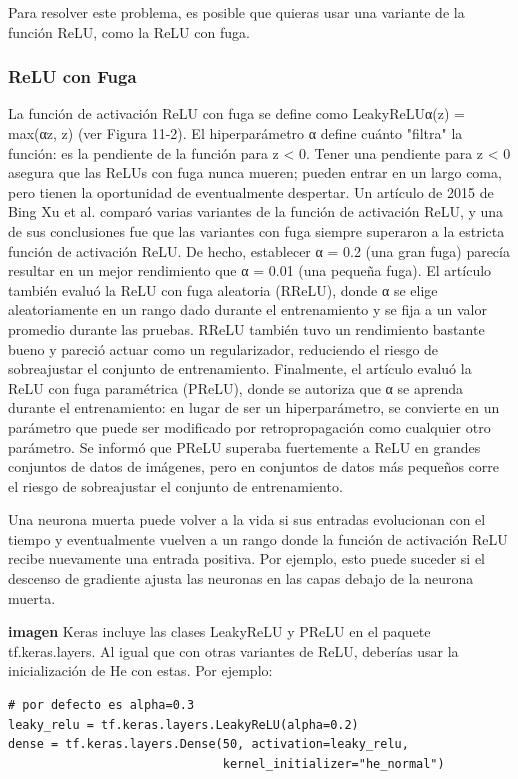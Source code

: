 \documentclass[11pt]{article}
\begin{document}
Para resolver este problema, es posible que quieras usar una variante
de la función ReLU, como la ReLU con fuga.

\subsubsection{ReLU con Fuga}
\label{sec:orgf55f9e6}
La función de activación ReLU con fuga se define como LeakyReLUα(z) =
max(αz, z) (ver Figura 11-2). El hiperparámetro α define cuánto
"filtra" la función: es la pendiente de la función para z < 0. Tener
una pendiente para z < 0 asegura que las ReLUs con fuga nunca mueren;
pueden entrar en un largo coma, pero tienen la oportunidad de
eventualmente despertar. Un artículo de 2015 de Bing Xu et al. comparó
varias variantes de la función de activación ReLU, y una de sus
conclusiones fue que las variantes con fuga siempre superaron a la
estricta función de activación ReLU. De hecho, establecer α = 0.2 (una
gran fuga) parecía resultar en un mejor rendimiento que α = 0.01 (una
pequeña fuga). El artículo también evaluó la ReLU con fuga aleatoria
(RReLU), donde α se elige aleatoriamente en un rango dado durante el
entrenamiento y se fija a un valor promedio durante las pruebas. RReLU
también tuvo un rendimiento bastante bueno y pareció actuar como un
regularizador, reduciendo el riesgo de sobreajustar el conjunto de
entrenamiento. Finalmente, el artículo evaluó la ReLU con fuga
paramétrica (PReLU), donde se autoriza que α se aprenda durante el
entrenamiento: en lugar de ser un hiperparámetro, se convierte en un
parámetro que puede ser modificado por retropropagación como cualquier
otro parámetro. Se informó que PReLU superaba fuertemente a ReLU en
grandes conjuntos de datos de imágenes, pero en conjuntos de datos más
pequeños corre el riesgo de sobreajustar el conjunto de entrenamiento.

Una neurona muerta puede volver a la vida si sus entradas evolucionan
con el tiempo y eventualmente vuelven a un rango donde la función de
activación ReLU recibe nuevamente una entrada positiva. Por ejemplo,
esto puede suceder si el descenso de gradiente ajusta las neuronas en
las capas debajo de la neurona muerta.

\textbf{imagen} Keras incluye las clases LeakyReLU y PReLU en el paquete
tf.keras.layers. Al igual que con otras variantes de ReLU, deberías
usar la inicialización de He con estas. Por ejemplo:

\begin{verbatim}
# por defecto es alpha=0.3
leaky_relu = tf.keras.layers.LeakyReLU(alpha=0.2)
dense = tf.keras.layers.Dense(50, activation=leaky_relu,
                              kernel_initializer="he_normal")
\end{verbatim}
\end{document}
